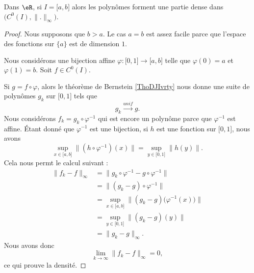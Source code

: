 \begin{corollary}       \label{CORooCWLMooWwCOAP}
	Dans \( \eR\), si \( I=\mathopen[ a , b \mathclose]\) alors les polynômes forment une partie dense dans \( \big( C^0(I),\| . \|_{\infty} \big) \).
\end{corollary}

\begin{proof}
	Nous supposons que \( b>a\). Le cas \( a=b\) est assez facile parce que l'espace des fonctions sur \( \{ a \}\) est de dimension \( 1\).

	Nous considérons une bijection affine \( \varphi\colon \mathopen[ 0 , 1 \mathclose]   \to \mathopen[ a , b \mathclose]\) telle que \( \varphi(0)=a\) et \( \varphi(1)=b\). Soit \( f\in C^0(I)\).

	Si \( g=f\circ\varphi\), alors le théorème de Bernstein \ref{ThoDJIvrty} nous donne une suite de polynômes \( g_k\) sur \( \mathopen[ 0 , 1 \mathclose]\) tels que
	\begin{equation}
		g_k\stackrel{unif}{\longrightarrow}g.
	\end{equation}
	Nous considérons \( f_k=g_k\circ\varphi^{-1}\) qui est encore un polynôme parce que \( \varphi^{-1}\) est affine. Étant donné que \( \varphi^{-1}\) est une bijection, si \( h\) est une fonction sur \( \mathopen[ 0 , 1 \mathclose]\), nous avons
	\begin{equation}
		\sup_{x\in \mathopen[ a , b \mathclose]}\| (h\circ\varphi^{-1})(x) \|=\sup_{y\in \mathopen[ 0 , 1 \mathclose]}\| h(y) \|.
	\end{equation}
	Cela nous permt le calcul suivant :
	\begin{subequations}
		\begin{align}
			\| f_k-f \|_{\infty} & =\| g_k\circ\varphi^{-1}-g\circ\varphi^{-1} \|                                    \\
			                     & =\| (g_k-g)\circ\varphi^{-1} \|                                                   \\
			                     & =\sup_{x\in \mathopen[ a , b \mathclose]}\| (g_k-g)\big( \varphi^{-1}(x) \big) \| \\
			                     & =\sup_{y\in\mathopen[ 0 , 1 \mathclose]}\| (g_k-g)(y) \|                          \\
			                     & =\| g_k-g \|_{\infty}.
		\end{align}
	\end{subequations}
	Nous avons donc
	\begin{equation}
		\lim_{k\to \infty} \| f_k-f \|_{\infty}=0,
	\end{equation}
	ce qui prouve la densité.
\end{proof}

